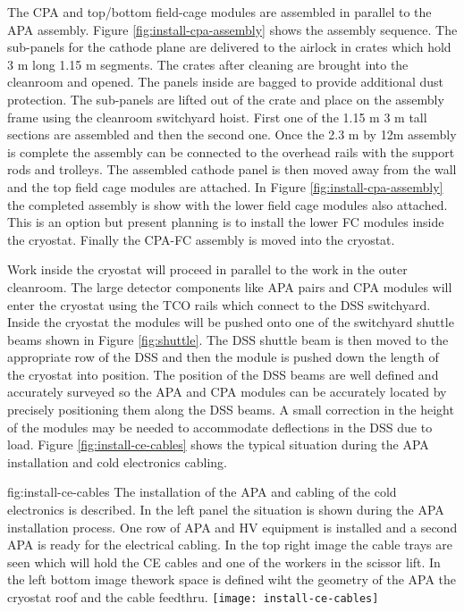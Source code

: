 The CPA and top/bottom field-cage modules are assembled in parallel to the APA assembly. Figure \ref{fig:install-cpa-assembly} shows the  assembly sequence. The sub-panels for the cathode plane are delivered to the airlock in crates which hold 3 \si{m} long 1.15 \si{m} segments. The crates after cleaning are brought into the cleanroom and opened. The panels inside are bagged to provide additional dust protection. The sub-panels are lifted out of the crate and place on the assembly frame using the cleanroom switchyard hoist. First one of the 1.15 \si{m} 3 
\si{m} tall sections are assembled and then the second one. Once the 2.3 \si{m} by 12\si{m} assembly is complete the assembly can be connected to the overhead rails with the support rods and trolleys. The assembled cathode panel is then moved away from the wall and the top field cage modules are attached. In Figure \ref{fig:install-cpa-assembly} the completed assembly is show with the lower field cage modules also attached. This is an option but present planning is to install the lower FC modules  inside the cryostat. Finally the CPA-FC assembly is moved into the cryostat.





Work inside the cryostat will proceed in parallel to the work in the outer cleanroom. 
The large detector components like APA pairs and CPA modules will enter the cryostat using the TCO rails which connect to the DSS switchyard.
Inside the cryostat the modules will be pushed onto one of the switchyard shuttle beams shown in  Figure \ref{fig:shuttle}. 
The DSS shuttle beam is then moved to the appropriate row of the DSS and then the module is pushed down the length of the cryostat into position. The position of the DSS beams are well defined and accurately surveyed so the APA and CPA modules can be accurately located by precisely positioning them along the DSS beams. A small correction in the height of the modules may be needed to accommodate deflections in the DSS due to load. Figure \ref{fig:install-ce-cables} shows the typical situation during the APA installation and cold electronics cabling. 

\begin{dunefigure}{fig:install-ce-cables}
  {The installation of the APA and cabling of the cold electronics is described. In the left panel the situation is shown during the APA installation process. One row of APA and HV equipment is installed and a second APA is ready for the electrical cabling. In the top right image the cable trays are seen which will hold the CE cables and one of the workers in the scissor lift. In the left bottom image thework space is defined wiht the geometry of the APA the cryostat roof and the cable feedthru.}
\texttt{[image: install-ce-cables]}
\end{dunefigure}

